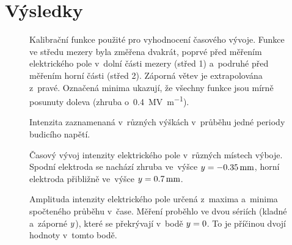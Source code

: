 \section{Výsledky}
\label{sec:efish-results}

\begin{figure}
	\centering
	
	\caption{Kalibrační funkce použité pro vyhodnocení časového vývoje.
		Funkce ve středu mezery byla změřena dvakrát, poprvé před měřením
		elektrického pole v~dolní části mezery (střed 1)
		a~podruhé před měřením horní části (střed 2).
		Záporná větev je extrapolována z~pravé.
		Označená minima ukazují, že všechny funkce jsou mírně posunuty
		doleva (zhruba o~\SI{0.4}{\mega\volt\per\metre}).}
	\label{fig:efish-period-calib}
\end{figure}

\begin{figure}[htp]
	\centering
	
	\caption{Intenzita \EFISH{} zaznamenaná v~různých výškách
		v~průběhu jedné periody budicího napětí.}
	\label{fig:efish-period-efish}
\end{figure}

\begin{figure}[p]
	
	\caption{Časový vývoj intenzity elektrického pole
		v~různých místech výboje.
		Spodní elektroda se nachází zhruba ve~výšce
		$y = \SI{-0.35}{\milli\metre}$,
		horní elektroda přibližně ve~výšce
		$y = \SI{0.7}{\milli\metre}$.}
\end{figure}

\begin{figure}[htp]
	\centering
	
	\caption{Amplituda intenzity elektrického pole určená z~maxima
		a~minima spočteného průběhu v~čase.
		Měření proběhlo ve dvou sériích (kladné a~záporné $y$),
		které se překrývají v~bodě $y = 0$.
		To je příčinou dvojí hodnoty v~tomto bodě.}
	\label{fig:efish-period-amplitude}
\end{figure}
